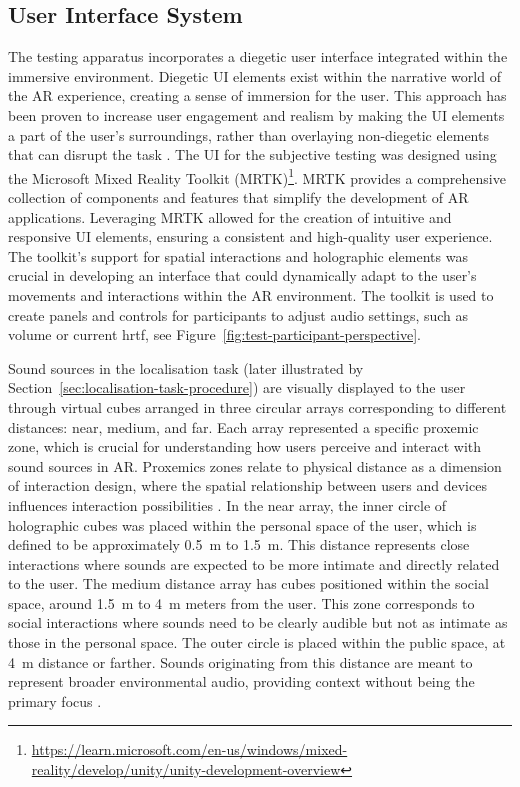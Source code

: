 \subsection{User Interface System}
The testing apparatus incorporates a diegetic user interface integrated within the immersive environment. Diegetic UI elements exist within the narrative world of the AR experience, creating a sense of immersion for the user. This approach has been proven to increase user engagement and realism by making the UI elements a part of the user's surroundings, rather than overlaying non-diegetic elements that can disrupt the task \citep{dickinson2021diegetic}.
The UI for the subjective testing was designed using the Microsoft Mixed Reality Toolkit (MRTK)\footnote{\url{https://learn.microsoft.com/en-us/windows/mixed-reality/develop/unity/unity-development-overview}}. MRTK provides a comprehensive collection of components and features that simplify the development of AR applications. Leveraging MRTK allowed for the creation of intuitive and responsive UI elements, ensuring a consistent and high-quality user experience. The toolkit's support for spatial interactions and holographic elements was crucial in developing an interface that could dynamically adapt to the user's movements and interactions within the AR environment. The toolkit is used to create panels and controls for participants to adjust audio settings, such as volume or current \acrshort{hrtf}, see Figure~\ref{fig:test-participant-perspective}.\par
Sound sources in the localisation task (later illustrated by Section~\ref{sec:localisation-task-procedure}) are visually displayed to the user through virtual cubes arranged in three circular arrays corresponding to different distances: near, medium, and far. Each array represented a specific proxemic zone, which is crucial for understanding how users perceive and interact with sound sources in AR. 
Proxemics zones relate to physical distance as a dimension of interaction design, where the spatial relationship between users and devices influences interaction possibilities \citep{huang2022proxemics}. In the near array, the inner circle of holographic cubes was placed within the personal space of the user, which is defined to be approximately \qty{0.5}{\metre} to \qty{1.5}{\metre}. This distance represents close interactions where sounds are expected to be more intimate and directly related to the user. The medium distance array has cubes positioned within the social space, around \qty{1.5}{\metre} to \qty{4}{\metre} meters from the user. This zone corresponds to social interactions where sounds need to be clearly audible but not as intimate as those in the personal space. The outer circle is placed within the public space, at \qty{4}{\metre} distance or farther. Sounds originating from this distance are meant to represent broader environmental audio, providing context without being the primary focus \citep{buschel2021miria}.

